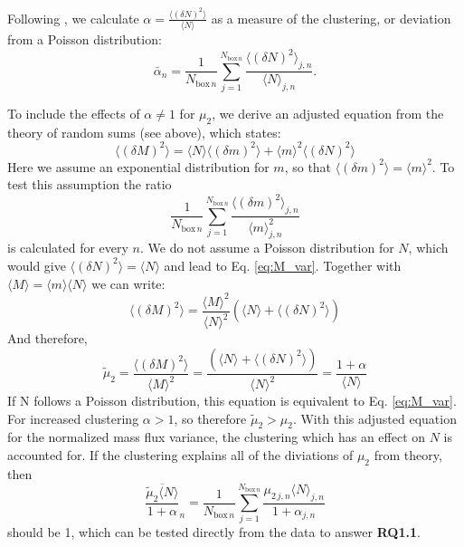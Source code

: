 \documentclass[a4paper, 12pt]{article}
\begin{document}
Following \cite{Davoudi2010}, we calculate $\alpha = \frac{\langle (\delta N)^2 \rangle}{\langle N \rangle}$ as a measure of the clustering, or deviation from a Poisson distribution:
\begin{equation} \label{eq:mean_alpha}
 \bar{\alpha}_n = \frac{1}{N_{\mathrm{box}\,n}} \sum_{j=1}^{N_{\mathrm{box}\,n}} \frac{\langle (\delta N)^2 \rangle_{j,n}}{\langle N \rangle_{j,n}}.
\end{equation}

To include the effects of $\alpha \neq 1$ for $\mu_2$, we derive an adjusted equation from the theory of random sums (see above), which states:
\begin{equation} \label{eq:derivation_1}
 \langle (\delta M)^2 \rangle = \langle N \rangle \langle (\delta m)^2 \rangle + \langle m \rangle^2 \langle (\delta N)^2 \rangle
\end{equation}
Here we assume an exponential distribution for $m$, so that $\langle (\delta m)^2 \rangle = \langle m \rangle^2$. To test this assumption the ratio
\begin{equation} \label{eq:m_exp_test}
 \frac{1}{N_{\mathrm{box}\,n}} \sum_{j=1}^{N_{\mathrm{box}\,n}} \frac{\langle (\delta m)^2 \rangle_{j,n}}{\langle m \rangle_{j,n}^2}
\end{equation}
is calculated for every $n$. We do not assume a Poisson distribution for $N$, which would give $\langle (\delta N)^2 \rangle = \langle N \rangle$ and lead to Eq. \ref{eq:M_var}. Together with $\langle M \rangle = \langle m \rangle \langle N \rangle$ we can write:
\begin{equation} \label{eq:derivation_2}
 \langle (\delta M)^2 \rangle = \frac{\langle M \rangle^2}{\langle N \rangle^2} (\langle N \rangle + \langle (\delta N)^2 \rangle)
\end{equation}
And therefore,
\begin{equation} \label{eq:adjusted_M_var}
 \tilde{\mu}_2 = \frac{\langle (\delta M)^2 \rangle}{\langle M \rangle^2} = \frac{(\langle N \rangle + \langle (\delta N)^2 \rangle)}{\langle N \rangle^2 } = \frac{1+\alpha}{\langle N \rangle}
\end{equation}
If N follows a Poisson distribution, this equation is equivalent to Eq. \ref{eq:M_var}. For increased clustering $\alpha>1$, so therefore $\tilde{\mu}_2 > \mu_2$. With this adjusted equation for the normalized mass flux variance, the clustering which has an effect on $N$ is accounted for. If the clustering explains all of the diviations of $\mu_2$ from theory, then 
\begin{equation} \label{eq:adjusted_M_var}
 \overline{\frac{\tilde{\mu}_2 \langle N \rangle}{1+\alpha}}_n = \frac{1}{N_{\mathrm{box}\,n}} \sum_{j=1}^{N_{\mathrm{box}\,n}} \frac{\mu_{2\,j,n}\langle N\rangle_{j,n}}{1 + \alpha_{j,n}}
\end{equation} 
should be 1, which can be tested directly from the data to answer \textbf{RQ1.1}.
\end{document}
